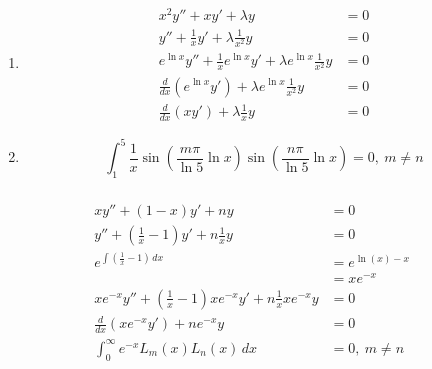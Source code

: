 \documentclass{article}
\begin{document}
\begin{enumerate}
  \item

        \begin{align*}
          x^2 y'' + x y' + \lambda y                                                   & = 0 \\
          y'' + \frac{1}{x} y' + \lambda \frac{1}{x^2} y                               & = 0 \\
          e^{\ln x} y'' + \frac{1}{x} e^{\ln x} y' + \lambda e^{\ln x} \frac{1}{x^2} y & = 0 \\
          \frac{d}{d x} (e^{\ln x} y') + \lambda e^{\ln x} \frac{1}{x^2} y             & = 0 \\
          \frac{d}{d x} (x y') + \lambda \frac{1}{x} y                                 & = 0
        \end{align*}

  \item

        \[\int_1^5 \frac{1}{x} \sin \left( \frac{m \pi}{\ln 5} \ln x \right) \sin \left( \frac{n \pi}{\ln 5} \ln x \right) = 0,\ m \ne n\]
\end{enumerate}

\setcounter{subsubsection}{8}
\subsubsection{}

\begin{align*}
  x y'' + (1 - x) y' + n y                                                             & = 0               \\
  y'' + \left( \frac{1}{x} - 1 \right) y' + n \frac{1}{x} y                            & = 0               \\
  e^{\int \left( \frac{1}{x} - 1 \right) \,d x}                                        & = e^{\ln (x) - x} \\
                                                                                       & = x e^{-x}        \\
  x e^{-x} y'' + \left( \frac{1}{x} - 1 \right) x e^{-x} y' + n \frac{1}{x} x e^{-x} y & = 0               \\
  \frac{d}{d x} (x e^{-x} y') + n e^{-x} y                                             & = 0               \\
  \int_0^\infty e^{-x} L_m(x) L_n(x) \,d x                                             & = 0,\ m \ne n
\end{align*}
\end{document}
